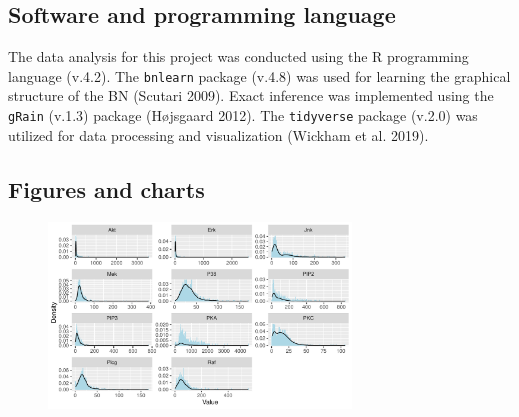 \documentclass[twocol]{ametsoc}
\begin{document}
\appendix

\hypertarget{software-and-programming-language}{%
\subsection{Software and programming
language}\label{software-and-programming-language}}

The data analysis for this project was conducted using the R programming
language (v.4.2). The \texttt{bnlearn} package (v.4.8) was used for
learning the graphical structure of the BN (Scutari 2009). Exact
inference was implemented using the \texttt{gRain} (v.1.3) package
(Højsgaard 2012). The \texttt{tidyverse} package (v.2.0) was utilized
for data processing and visualization (Wickham et al. 2019).

\hypertarget{figures-and-charts}{%
\subsection{Figures and charts}\label{figures-and-charts}}

\begin{figure}[h]
\centerline{\includegraphics[width = 19pc]{images/molecule_skews.pdf}}
\end{figure}
\end{document}
